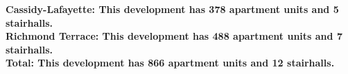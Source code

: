 \bf{Cassidy-Lafayette}: This development has 378 apartment units and 5 stairhalls.\\\bf{Richmond Terrace}: This development has 488 apartment units and 7 stairhalls.\\\bf{Total}: This development has 866 apartment units and 12 stairhalls.\\
